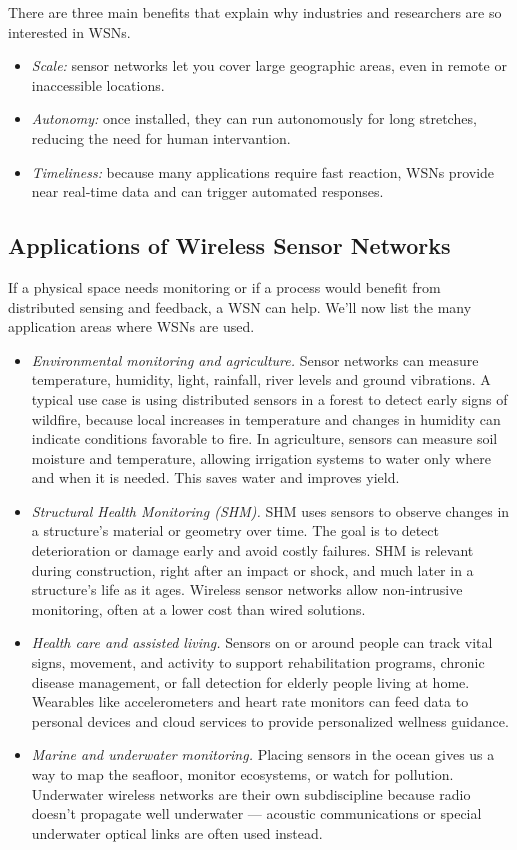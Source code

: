 There are three main benefits that explain why industries and researchers are so interested in WSNs.
\begin{itemize}
    \item \textit{Scale:} sensor networks let you cover large geographic areas, even in remote or inaccessible locations. 
    \item \textit{Autonomy:} once installed, they can run autonomously for long stretches, reducing the need for human intervantion. 
    \item \textit{Timeliness:} because many applications require fast reaction, WSNs provide near real‑time data and can trigger automated responses.
\end{itemize}

\subsection{Applications of Wireless Sensor Networks}
If a physical space needs monitoring or if a process would benefit from distributed sensing and feedback, a WSN can help. We'll now list the many application areas where WSNs are used.
\begin{itemize}
    \item \textit{Environmental monitoring and agriculture.} Sensor networks can measure temperature, humidity, light, rainfall, river levels and ground vibrations. A typical use case is using distributed sensors in a forest to detect early signs of wildfire, because local increases in temperature and changes in humidity can indicate conditions favorable to fire. In agriculture, sensors can measure soil moisture and temperature, allowing irrigation systems to water only where and when it is needed. This saves water and improves yield.
    \item \textit{Structural Health Monitoring (SHM).} SHM uses sensors to observe changes in a structure’s material or geometry over time. The goal is to detect deterioration or damage early and avoid costly failures. SHM is relevant during construction, right after an impact or shock, and much later in a structure’s life as it ages. Wireless sensor networks allow non‑intrusive monitoring, often at a lower cost than wired solutions.
    \item \textit{Health care and assisted living.} Sensors on or around people can track vital signs, movement, and activity to support rehabilitation programs, chronic disease management, or fall detection for elderly people living at home. Wearables like accelerometers and heart rate monitors can feed data to personal devices and cloud services to provide personalized wellness guidance.
    \item \textit{Marine and underwater monitoring.} Placing sensors in the ocean gives us a way to map the seafloor, monitor ecosystems, or watch for pollution. Underwater wireless networks are their own subdiscipline because radio doesn’t propagate well underwater — acoustic communications or special underwater optical links are often used instead.
\end{itemize}

